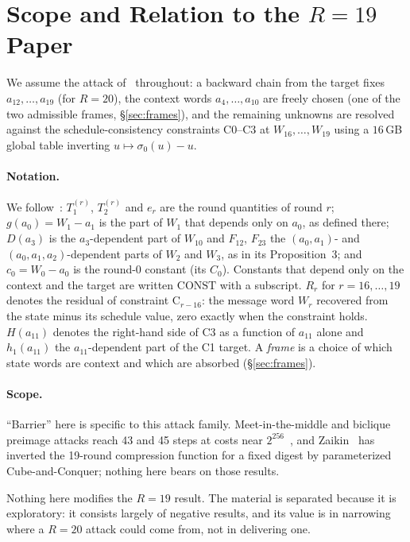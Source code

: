 \documentclass[11pt,a4paper]{article}
\newcommand{\sig}[1]{\sigma_{#1}}
\begin{document}
\section{Scope and Relation to the \texorpdfstring{$R=19$}{R=19} Paper}

We assume the attack of~\cite{Basra2026R19} throughout: a backward chain from
the target fixes $a_{12},\ldots,a_{19}$ (for $R{=}20$), the context words
$a_4,\ldots,a_{10}$ are freely chosen (one of the two admissible frames,
\S\ref{sec:frames}), and the remaining unknowns are resolved
against the schedule-consistency constraints C0--C3 at $W_{16},\ldots,W_{19}$
using a $16$\,GB global table inverting $u\mapsto\sig{0}(u)-u$.

\paragraph{Notation.}
We follow~\cite{Basra2026R19}: $T_1^{(r)}$, $T_2^{(r)}$ and $e_r$ are the
round quantities of round $r$; $g(a_0) = W_1 - a_1$ is the part of $W_1$
that depends only on $a_0$, as defined there; $D(a_3)$ is the
$a_3$-dependent part of $W_{10}$ and $F_{12}$, $F_{23}$ the
$(a_0,a_1)$- and $(a_0,a_1,a_2)$-dependent parts of $W_2$ and $W_3$, as in
its Proposition~3; and $c_0 = W_0 - a_0$ is the round-0 constant (its
$C_0$).  Constants that depend only on the context and the target are
written $\mathrm{CONST}$ with a subscript.  $R_r$ for $r=16,\ldots,19$
denotes the residual of constraint C$_{r-16}$: the message word $W_r$
recovered from the state minus its schedule value, zero exactly when the
constraint holds.  $H(a_{11})$ denotes the
right-hand side of C3 as a function of $a_{11}$ alone and $h_1(a_{11})$ the
$a_{11}$-dependent part of the C1 target.  A \emph{frame} is a choice of
which state words are context and which are absorbed
(\S\ref{sec:frames}).

\paragraph{Scope.}
``Barrier'' here is specific to this attack family.  Meet-in-the-middle
and biclique preimage attacks reach 43 and 45 steps at costs near
$2^{256}$~\cite{AokiGuo2009,KRS2012}, and Zaikin~\cite{Zaikin2026} has
inverted the 19-round compression function for a fixed digest by
parameterized Cube-and-Conquer; nothing here bears on those results.

Nothing here modifies the $R{=}19$ result.  The material is separated because
it is exploratory: it consists largely of negative results, and its value is in
narrowing where a $R{=}20$ attack could come from, not in delivering one.
\end{document}
